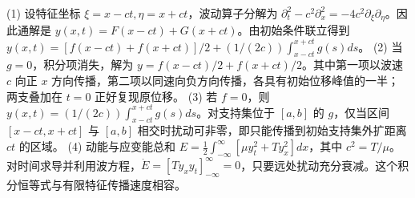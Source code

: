 (1) 设特征坐标 \(\xi=x-ct,\eta=x+ct\)，波动算子分解为 \(\partial_t^2-c^2\partial_x^2=-4c^2\partial_\xi\partial_\eta\)。因此通解是 \(y(x,t)=F(x-ct)+G(x+ct)\)。由初始条件联立得到 \(y(x,t)=[f(x-ct)+f(x+ct)]/2+(1/(2c))\int_{x-ct}^{x+ct}g(s)ds\)。
(2) 当 \(g=0\)，积分项消失，解为 \(y=f(x-ct)/2+f(x+ct)/2\)。其中第一项以波速 \(c\) 向正 \(x\) 方向传播，第二项以同速向负方向传播，各具有初始位移峰值的一半；两支叠加在 \(t=0\) 正好复现原位移。
(3) 若 \(f=0\)，则 \(y(x,t)=(1/(2c))\int_{x-ct}^{x+ct}g(s)ds\)。对支持集位于 \([a,b]\) 的 \(g\)，仅当区间 \([x-ct,x+ct]\) 与 \([a,b]\) 相交时扰动可非零，即只能传播到初始支持集外扩距离 \(ct\) 的区域。
(4) 动能与应变能总和 \(E=\frac12\int_{-\infty}^{\infty}[\mu y_t^2+T y_x^2]dx\)，其中 \(c^2=T/\mu\)。对时间求导并利用波方程，\(\dot E=[Ty_xy_t]_{-\infty}^{\infty}=0\)，只要远处扰动充分衰减。这个积分恒等式与有限特征传播速度相容。
